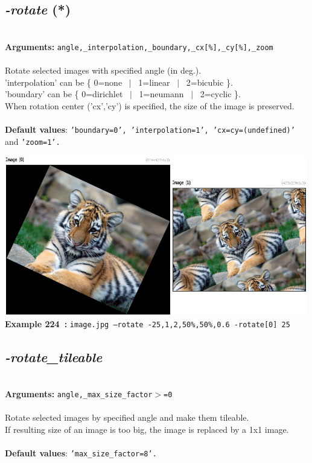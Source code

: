 \documentclass[a4paper,11pt,twoside]{book}
\begin{document}
\subsection{\emph{-rotate} (*)}\vspace*{-0.5em}
~\\\textbf{Arguments: } 
{\small \texttt{angle,\_interpolation,\_boundary,\_cx[\%],\_cy[\%],\_zoom}}\\~\\
Rotate selected images with specified angle (in deg.).
~\\'interpolation' can be \{ 0=none ~$|$~ 1=linear ~$|$~ 2=bicubic \}.
~\\'boundary' can be \{ 0=dirichlet ~$|$~ 1=neumann ~$|$~ 2=cyclic \}.
~\\When rotation center ('cx','cy') is specified, the size of the image is preserved.
~\\~\\\textbf{Default values}: {\small \texttt{'boundary=0', 'interpolation=1', 'cx=cy=(undefined)'} and \texttt{'zoom=1'.}}
\begin{center}\includegraphics[keepaspectratio=true,height=7cm,width=\textwidth]{img/gmic_def224.jpg}\\
{\footnotesize \textbf{Example 224~:} \texttt{image.jpg --rotate -25,1,2,50\%,50\%,0.6 -rotate[0] 25}}
\end{center}

\subsection{\emph{-rotate\_tileable} }\vspace*{-0.5em}
~\\\textbf{Arguments: } 
{\small \texttt{angle,\_max\_size\_factor$>$=0}}\\~\\
Rotate selected images by specified angle and make them tileable.
~\\If resulting size of an image is too big, the image is replaced by a 1x1 image.
~\\~\\\textbf{Default values}: {\small \texttt{'max\_size\_factor=8'.}}
\end{document}
